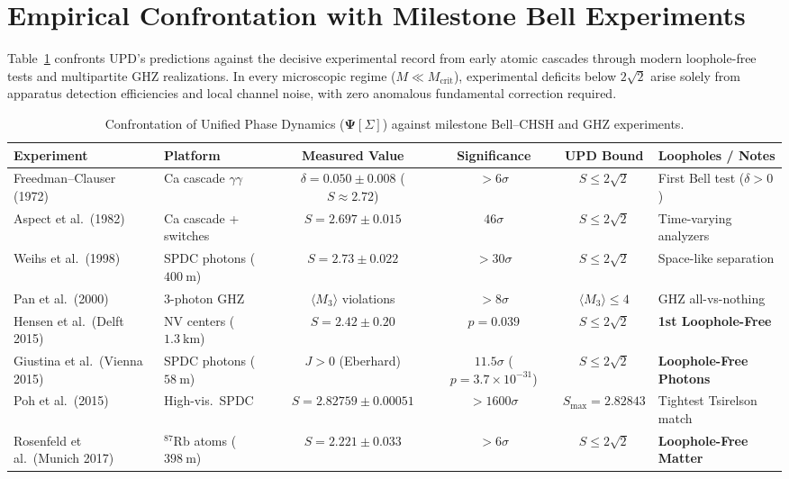 \documentclass[11pt,a4paper]{article}
\begin{document}
\section{Empirical Confrontation with Milestone Bell Experiments}
Table~\ref{tab:experiments} confronts UPD's predictions against the decisive experimental record from early atomic cascades through modern loophole-free tests and multipartite GHZ realizations. In every microscopic regime ($M \ll M_{\mathrm{crit}}$), experimental deficits below $2\sqrt{2}$ arise solely from apparatus detection efficiencies and local channel noise, with zero anomalous fundamental correction required.

\begin{table}[h]
\centering
\caption{Confrontation of Unified Phase Dynamics ($\mathbf{\Psi}[\Sigma]$) against milestone Bell--CHSH and GHZ experiments.}
\label{tab:experiments}
\begin{tabular}{llcccl}
\toprule
\textbf{Experiment} & \textbf{Platform} & \textbf{Measured Value} & \textbf{Significance} & \textbf{UPD Bound} & \textbf{Loopholes / Notes} \\
\midrule
Freedman--Clauser (1972) \cite{Freedman1972} & Ca cascade $\gamma\gamma$ & $\delta = 0.050 \pm 0.008$ ($S\approx 2.72$) & $>6\sigma$ & $S \le 2\sqrt{2}$ & First Bell test ($\delta > 0$) \\
Aspect et al.\ (1982) \cite{Aspect1982} & Ca cascade + switches & $S = 2.697 \pm 0.015$ & $46\sigma$ & $S \le 2\sqrt{2}$ & Time-varying analyzers \\
Weihs et al.\ (1998) \cite{Weihs1998} & SPDC photons ($400\ \mathrm{m}$) & $S = 2.73 \pm 0.022$ & $>30\sigma$ & $S \le 2\sqrt{2}$ & Space-like separation \\
Pan et al.\ (2000) & 3-photon GHZ & $\langle M_3\rangle$ violations & $>8\sigma$ & $\langle M_3\rangle \le 4$ & GHZ all-vs-nothing \\
Hensen et al.\ (Delft 2015) \cite{Hensen2015} & NV centers ($1.3\ \mathrm{km}$) & $S = 2.42 \pm 0.20$ & $p=0.039$ & $S \le 2\sqrt{2}$ & \textbf{1st Loophole-Free} \\
Giustina et al.\ (Vienna 2015) \cite{Giustina2015} & SPDC photons ($58\ \mathrm{m}$) & $J > 0$ (Eberhard) & $11.5\sigma$ ($p=3.7\times 10^{-31}$) & $S \le 2\sqrt{2}$ & \textbf{Loophole-Free Photons} \\
Poh et al.\ (2015) & High-vis.\ SPDC & $S = 2.82759 \pm 0.00051$ & $>1600\sigma$ & $S_{\max} = 2.82843$ & Tightest Tsirelson match \\
Rosenfeld et al.\ (Munich 2017) & $^{87}\mathrm{Rb}$ atoms ($398\ \mathrm{m}$) & $S = 2.221 \pm 0.033$ & $>6\sigma$ & $S \le 2\sqrt{2}$ & \textbf{Loophole-Free Matter} \\

\end{tabular}
\end{table}
\end{document}
